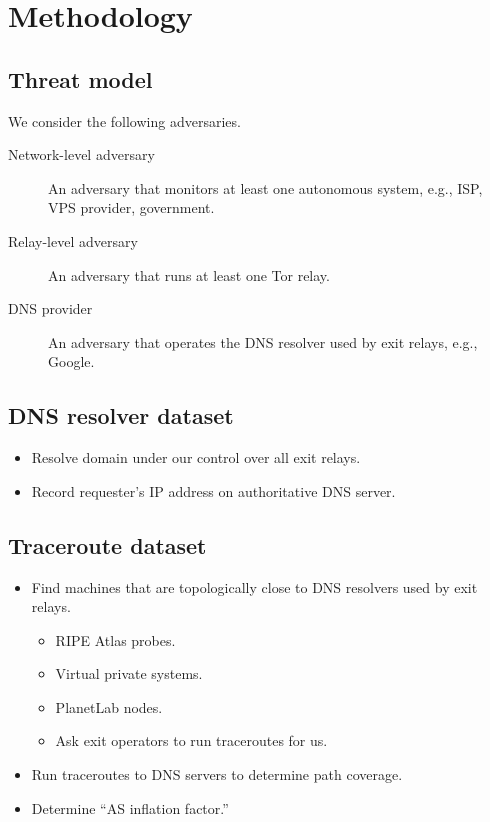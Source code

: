 \section{Methodology}
\label{sec:methodology}

\subsection{Threat model}
We consider the following adversaries.
\begin{description}
	\item[Network-level adversary] An adversary that monitors at least
		one autonomous system, e.g., ISP, VPS provider, government.
	\item[Relay-level adversary] An adversary that runs at least one Tor relay.
	\item[DNS provider] An adversary that operates the DNS resolver used
		by exit relays, e.g., Google.
\end{description}

\subsection{DNS resolver dataset}
\label{sec:dns-resolver-dataset}
\begin{itemize}
	\item Resolve domain under our control over all exit relays.
	\item Record requester's IP address on authoritative DNS server.
\end{itemize}

\subsection{Traceroute dataset}
\label{sec:traceroute-dataset}
\begin{itemize}
	\item Find machines that are topologically close to DNS resolvers
		used by exit relays.
	\begin{itemize}
		\item RIPE Atlas probes.
		\item Virtual private systems.
		\item PlanetLab nodes.
		\item Ask exit operators to run traceroutes for us.
	\end{itemize}
	\item Run traceroutes to DNS servers to determine path coverage.
	\item Determine ``AS inflation factor.''
\end{itemize}

